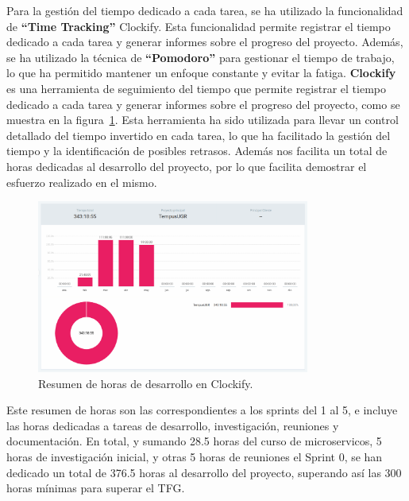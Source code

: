 Para la gestión del tiempo dedicado a cada tarea, se ha utilizado la funcionalidad de \textbf{``Time Tracking''} Clockify. Esta funcionalidad permite registrar el tiempo dedicado a cada tarea y generar informes sobre el progreso del proyecto. Además, se ha utilizado la técnica de \textbf{``Pomodoro''} para gestionar el tiempo de trabajo, lo que ha permitido mantener un enfoque constante y evitar la fatiga.
\newline\newline
\textbf{Clockify}\cite{clockify} es una herramienta de seguimiento del tiempo que permite registrar el tiempo dedicado a cada tarea y generar informes sobre el progreso del proyecto, como se muestra en la figura~\ref{clockify}. Esta herramienta ha sido utilizada para llevar un control detallado del tiempo invertido en cada tarea, lo que ha facilitado la gestión del tiempo y la identificación de posibles retrasos.
Además nos facilita un total de horas dedicadas al desarrollo del proyecto, por lo que facilita demostrar el esfuerzo realizado en el mismo.

\begin{figure}[H] 
    \centering 
    \includegraphics[width=0.8\textwidth]{figures/05_clockify.png}
    \caption{Resumen de horas de desarrollo en Clockify.} %
    \label{clockify} %
\end{figure}

Este resumen de horas son las correspondientes a los sprints del 1 al 5, e incluye las horas dedicadas a tareas de desarrollo, investigación, reuniones y documentación. En total, y sumando 28.5 horas del curso de microservicos, 5 horas de investigación inicial, y otras 5 horas de reuniones el Sprint 0, se han dedicado un total de 376.5 horas al desarrollo del proyecto, superando así las 300 horas mínimas para superar el TFG.

